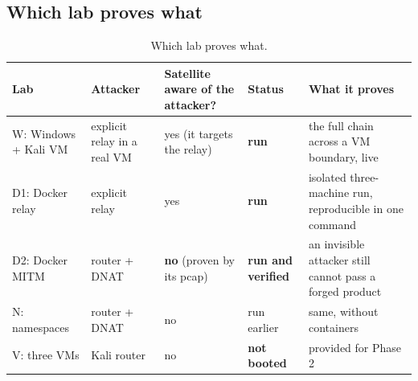 \subsection{Which lab proves what}
\begin{table}[!htbp]
\centering\small
\begin{tabularx}{\textwidth}{|L{2.9cm}|L{2.7cm}|L{2.5cm}|L{2.5cm}|Y|}
\hline
\textbf{Lab} & \textbf{Attacker} & \textbf{Satellite aware of the attacker?} & \textbf{Status} & \textbf{What it proves}\\
\hline
W: Windows + Kali VM & explicit relay in a real VM & yes (it targets the relay) & \textbf{run} & the full chain across a VM boundary, live\\
\hline
D1: Docker relay & explicit relay & yes & \textbf{run} & isolated three-machine run, reproducible in one command\\
\hline
D2: Docker MITM & router + DNAT & \textbf{no} (proven by its pcap) & \textbf{run and verified} & an invisible attacker still cannot pass a forged product\\
\hline
N: namespaces & router + DNAT & no & run earlier & same, without containers\\
\hline
V: three VMs & Kali router & no & \textbf{not booted} & provided for Phase 2\\
\hline
\end{tabularx}
\caption{Which lab proves what.}
\end{table}
